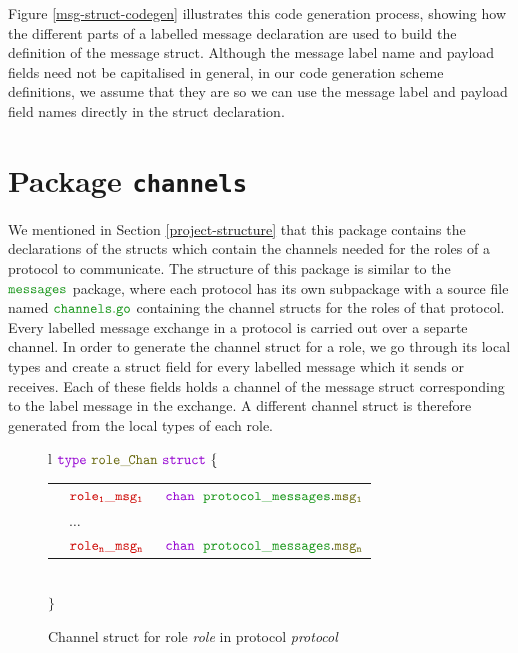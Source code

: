 \documentclass[12pt,twoside]{report}
\begin{document}
Figure \ref{msg-struct-codegen} illustrates this code generation process, showing how the different parts of a labelled message declaration are used to build the definition of the message struct. Although the message label name and payload fields need not be capitalised in general, in our code generation scheme definitions, we assume that they are so we can use the message label and payload field names directly in the struct declaration.\\

\section{Package \texttt{channels}}
We mentioned in Section \ref{project-structure} that this package contains the declarations of the structs which contain the channels needed for the roles of a protocol to communicate. The structure of this package is similar to the $\pkgname{messages}$ package, where each protocol has its own subpackage with a source file named $\filename{channels}$ containing the channel structs for the roles of that protocol.\\

Every labelled message exchange in a protocol is carried out over a separte channel. In order to generate the channel struct for a role, we go through its local types and create a struct field for every labelled message which it sends or receives. Each of these fields holds a channel of the message struct corresponding to the label message in the exchange. A different channel struct is therefore generated from the local types of each role.\\

\begin{figure}[!h]
    \begin{center}
        \begin{tabular}{l}
            $\gotype\ \structname{role\_\!Chan}\ \gostruct\ \{$\\[3pt]
            \begin{tabular}{lll}
                \indent & $\structfield{role_1\_msg_1}$\ &$\gochan\ \;\pkgstructaccess{protocol\_messages}{msg_1}$\\
                \indent & $\dots$ & \\
                \indent & $\structfield{role_n\_msg_n}$\ &$\gochan\ \;\pkgstructaccess{protocol\_messages}{msg_n}$
            \end{tabular}\\
            $\}$
        \end{tabular}
    \end{center}
    \caption{Channel struct for role \textit{role} in protocol \textit{protocol}}
    \label{channel-struct-gen}
\end{figure}
\end{document}

